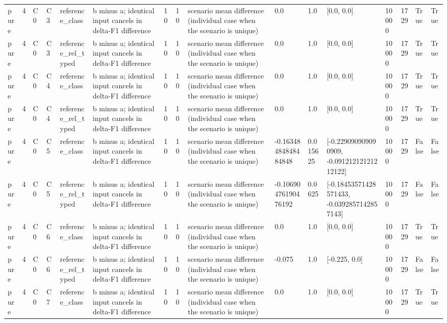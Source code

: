 \begin{tabular}{llllllllllllllll}
pure & 4 & C0 & C3 & reference\_class & b minus a; identical input cancels in delta-F1 difference & 10 & 10 & scenario mean difference (individual case when the scenario is unique) & 0.0 & 1.0 & [0.0, 0.0] & 10000 & 1729 & True & True \\
pure & 4 & C0 & C3 & reference\_rel\_typed & b minus a; identical input cancels in delta-F1 difference & 10 & 10 & scenario mean difference (individual case when the scenario is unique) & 0.0 & 1.0 & [0.0, 0.0] & 10000 & 1729 & True & True \\
pure & 4 & C0 & C4 & reference\_class & b minus a; identical input cancels in delta-F1 difference & 10 & 10 & scenario mean difference (individual case when the scenario is unique) & 0.0 & 1.0 & [0.0, 0.0] & 10000 & 1729 & True & True \\
pure & 4 & C0 & C4 & reference\_rel\_typed & b minus a; identical input cancels in delta-F1 difference & 10 & 10 & scenario mean difference (individual case when the scenario is unique) & 0.0 & 1.0 & [0.0, 0.0] & 10000 & 1729 & True & True \\
pure & 4 & C0 & C5 & reference\_class & b minus a; identical input cancels in delta-F1 difference & 10 & 10 & scenario mean difference (individual case when the scenario is unique) & -0.16348484848484848 & 0.015625 & [-0.229090909090909, -0.09121212121212122] & 10000 & 1729 & False & False \\
pure & 4 & C0 & C5 & reference\_rel\_typed & b minus a; identical input cancels in delta-F1 difference & 10 & 10 & scenario mean difference (individual case when the scenario is unique) & -0.10690476190476192 & 0.0625 & [-0.18453571428571433, -0.0392857142857143] & 10000 & 1729 & False & False \\
pure & 4 & C0 & C6 & reference\_class & b minus a; identical input cancels in delta-F1 difference & 10 & 10 & scenario mean difference (individual case when the scenario is unique) & 0.0 & 1.0 & [0.0, 0.0] & 10000 & 1729 & True & True \\
pure & 4 & C0 & C6 & reference\_rel\_typed & b minus a; identical input cancels in delta-F1 difference & 10 & 10 & scenario mean difference (individual case when the scenario is unique) & -0.075 & 1.0 & [-0.225, 0.0] & 10000 & 1729 & False & False \\
pure & 4 & C0 & C7 & reference\_class & b minus a; identical input cancels in delta-F1 difference & 10 & 10 & scenario mean difference (individual case when the scenario is unique) & 0.0 & 1.0 & [0.0, 0.0] & 10000 & 1729 & True & True \\

\end{tabular}
